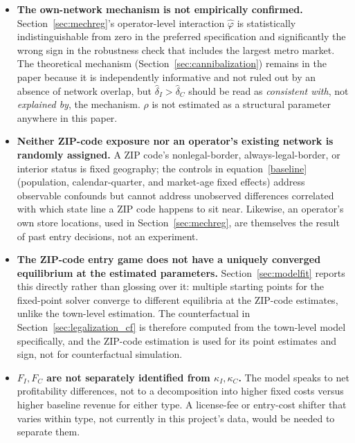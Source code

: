 \documentclass[english,12pt]{article}
\begin{document}
\begin{itemize}
\item \textbf{The own-network mechanism is not empirically confirmed.} Section~\ref{sec:mechreg}'s operator-level interaction $\hat\varphi$ is statistically indistinguishable from zero in the preferred specification and significantly the wrong sign in the robustness check that includes the largest metro market. The theoretical mechanism (Section~\ref{sec:cannibalization}) remains in the paper because it is independently informative and not ruled out by an absence of network overlap, but $\hat\delta_I>\hat\delta_C$ should be read as \emph{consistent with}, not \emph{explained by}, the mechanism. $\rho$ is not estimated as a structural parameter anywhere in this paper.
\item \textbf{Neither ZIP-code exposure nor an operator's existing network is randomly assigned.} A ZIP code's nonlegal-border, always-legal-border, or interior status is fixed geography; the controls in equation~\eqref{baseline} (population, calendar-quarter, and market-age fixed effects) address observable confounds but cannot address unobserved differences correlated with which state line a ZIP code happens to sit near. Likewise, an operator's own store locations, used in Section~\ref{sec:mechreg}, are themselves the result of past entry decisions, not an experiment.
\item \textbf{The ZIP-code entry game does not have a uniquely converged equilibrium at the estimated parameters.} Section~\ref{sec:modelfit} reports this directly rather than glossing over it: multiple starting points for the fixed-point solver converge to different equilibria at the ZIP-code estimates, unlike the town-level estimation. The counterfactual in Section~\ref{sec:legalization_cf} is therefore computed from the town-level model specifically, and the ZIP-code estimation is used for its point estimates and sign, not for counterfactual simulation.
\item \textbf{$F_I, F_C$ are not separately identified from $\kappa_I,\kappa_C$.} The model speaks to net profitability differences, not to a decomposition into higher fixed costs versus higher baseline revenue for either type. A license-fee or entry-cost shifter that varies within type, not currently in this project's data, would be needed to separate them.

\end{itemize}
\end{document}
